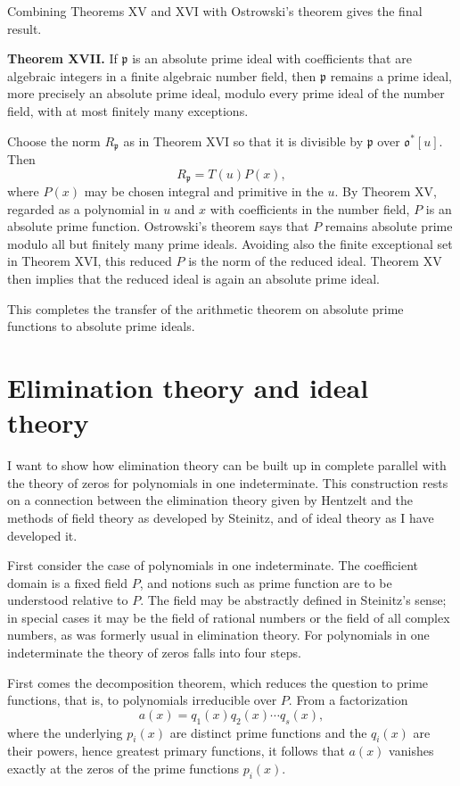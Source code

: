 \documentclass[11pt]{article}
\begin{document}
Combining Theorems XV and XVI with Ostrowski's theorem gives the final result.

\textbf{Theorem XVII.} If $\mathfrak p$ is an absolute prime ideal with coefficients that are algebraic integers in a finite algebraic number field, then $\mathfrak p$ remains a prime ideal, more precisely an absolute prime ideal, modulo every prime ideal of the number field, with at most finitely many exceptions.

Choose the norm $R_{\mathfrak p}$ as in Theorem XVI so that it is divisible by $\mathfrak p$ over $\mathfrak o^*[u]$. Then
\[
  R_{\mathfrak p}=T(u)P(x),
\]
where $P(x)$ may be chosen integral and primitive in the $u$. By Theorem XV, regarded as a polynomial in $u$ and $x$ with coefficients in the number field, $P$ is an absolute prime function. Ostrowski's theorem says that $P$ remains absolute prime modulo all but finitely many prime ideals. Avoiding also the finite exceptional set in Theorem XVI, this reduced $P$ is the norm of the reduced ideal. Theorem XV then implies that the reduced ideal is again an absolute prime ideal.

This completes the transfer of the arithmetic theorem on absolute prime functions to absolute prime ideals.

\section{Elimination theory and ideal theory}

I want to show how elimination theory can be built up in complete parallel with the theory of zeros for polynomials in one indeterminate. This construction rests on a connection between the elimination theory given by Hentzelt and the methods of field theory as developed by Steinitz, and of ideal theory as I have developed it.

First consider the case of polynomials in one indeterminate. The coefficient domain is a fixed field $P$, and notions such as prime function are to be understood relative to $P$. The field may be abstractly defined in Steinitz's sense; in special cases it may be the field of rational numbers or the field of all complex numbers, as was formerly usual in elimination theory. For polynomials in one indeterminate the theory of zeros falls into four steps.

First comes the decomposition theorem, which reduces the question to prime functions, that is, to polynomials irreducible over $P$. From a factorization
\[
  a(x)=q_1(x)q_2(x)\cdots q_s(x),
\]
where the underlying $p_i(x)$ are distinct prime functions and the $q_i(x)$ are their powers, hence greatest primary functions, it follows that $a(x)$ vanishes exactly at the zeros of the prime functions $p_i(x)$.
\end{document}
